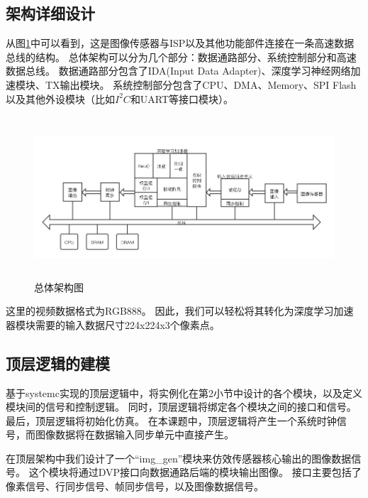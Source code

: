\subsection{架构详细设计}
从图\ref{fig:top_arch}中可以看到，这是图像传感器与ISP以及其他功能部件连接在一条高速数据总线的结构。
总体架构可以分为几个部分：数据通路部分、系统控制部分和高速数据总线。
数据通路部分包含了IDA(Input Data Adapter)、深度学习神经网络加速模块、TX输出模块。
系统控制部分包含了CPU、DMA、Memory、SPI Flash以及其他外设模块（比如$I^2C$和UART等接口模块）。
\begin{figure}[htbp]
    \centering
    \includegraphics[width=15cm,height=6cm]{figures/top_arch.png}
    \caption{总体架构图}
    \label{fig:top_arch}
\end{figure}
这里的视频数据格式为RGB888。
因此，我们可以轻松将其转化为深度学习加速器模块需要的输入数据尺寸224x224x3个像素点。


\subsection{顶层逻辑的建模}

基于systemc实现的顶层逻辑中，将实例化在第2小节中设计的各个模块，以及定义模块间的信号和控制逻辑。
同时，顶层逻辑将绑定各个模块之间的接口和信号。
最后，顶层逻辑将初始化仿真。
在本课题中，顶层逻辑将产生一个系统时钟信号，而图像数据将在数据输入同步单元中直接产生。  

在顶层架构中我们设计了一个“img_gen”模块来仿效传感器核心输出的图像数据信号。
这个模块将通过DVP接口向数据通路后端的模块输出图像。
接口主要包括了像素信号、行同步信号、帧同步信号，以及图像数据信号。


